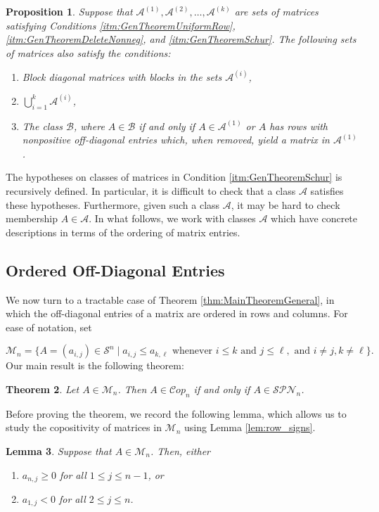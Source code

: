 \documentclass{amsart}
\newcommand{\cA}{\mathcal{A}}
\newcommand{\cB}{\mathcal{B}}
\newcommand{\cS}{\mathcal{S}}
\newcommand{\Cop}{\mathcal{C}op}
\newtheorem{theorem}{Theorem}[section]
\newtheorem{lemma}[theorem]{Lemma}
\newtheorem{proposition}[theorem]{Proposition}
\theoremstyle{definition}
\begin{document}
\begin{proposition}\label{prop:CombineGeneralClasses}
Suppose that $\cA^{(1)},\cA^{(2)},\ldots, \cA^{(k)}$ are sets of matrices satisfying Conditions \ref{itm:GenTheoremUniformRow},  \ref{itm:GenTheoremDeleteNonneg}, and \ref{itm:GenTheoremSchur}. The following sets of matrices also satisfy the conditions:

\begin{enumerate}
\item Block diagonal matrices with blocks in the sets $\cA^{(i)}$,
\item $\bigcup_{i = 1}^{k} \cA^{(i)}$,
\item The class $\cB$, where $A \in \cB$ if and only if $A \in \cA^{(1)}$ or $A$ has rows with nonpositive off-diagonal entries which, when removed, yield a matrix in $\cA^{(1)}$.
\end{enumerate}
\end{proposition}


The hypotheses on classes of matrices in Condition \ref{itm:GenTheoremSchur} is recursively defined. In particular, it is difficult to check that a class $\cA$ satisfies these hypotheses. Furthermore, given such a class $\cA$, it may be hard to check membership $A \in \cA$. In what follows, we work with classes $\cA$ which have concrete descriptions in terms of the ordering of matrix entries.  

\subsection{Ordered Off-Diagonal Entries}\label{sec:MainTheoremOrdered}  We now turn to a tractable case of Theorem \ref{thm:MainTheoremGeneral}, in which the off-diagonal entries of a matrix are ordered in rows and columns. For ease of notation, set 

\[\mathcal{M}_n = \{A = (a_{i,j}) \in \cS^n \; \vert \; a_{i,j}\leq a_{k,\ell} \text{ whenever } i\leq k \text{ and } j\leq \ell, \text{ and } i\neq j, k\neq \ell\}.\] 
Our main result is the following theorem:
\begin{theorem}\label{thm:Mn_SPN}
Let $A\in\mathcal{M}_n$. Then $A\in \Cop_n $ if and only if $A \in \mathcal{SPN}_n$.
\end{theorem}

Before proving the theorem, we record the following lemma, which allows us to study the copositivity of matrices in $\mathcal{M}_n$ using Lemma \ref{lem:row_signs}. 

\begin{lemma}\label{lem:Uniform_Row}
Suppose that $A\in \mathcal{M}_n$. Then, either 

\begin{enumerate}
\item $a_{n,j}\geq 0$ for all $1 \leq j \leq n-1$, or 
\item $a_{1,j} < 0$ for all $2\leq j \leq n$. 
\end{enumerate}
\end{lemma}
\end{document}

